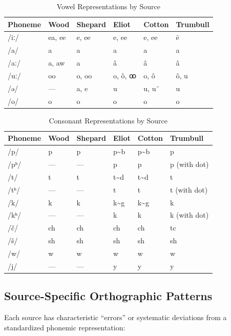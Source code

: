 \begin{table}[htbp]
\centering
\caption{Vowel Representations by Source}
\label{tab:1365-vowels}
\begin{tabular}{llllll}
\hline
Phoneme & Wood & Shepard & Eliot & Cotton & Trumbull \\
\hline
/iː/ & ea, ee & e, ee & e, ee & e, ee & ē \\
/a/ & a & a & a & a & a \\
/aː/ & a, aw & a & â & â & â \\
/uː/ & oo & o, oo & o, ô, ꝏ & o, ô & ô, u \\
/ə/ & --- & a, e & u & u, u˘ & u \\
/o/ & o & o & o & o & o \\
\hline
\end{tabular}
\end{table}

\begin{table}[htbp]
\centering
\caption{Consonant Representations by Source}
\label{tab:1365-consonants}
\begin{tabular}{llllll}
\hline
Phoneme & Wood & Shepard & Eliot & Cotton & Trumbull \\
\hline
/p/ & p & p & p\textasciitilde b & p\textasciitilde b & p \\
/pʰ/ & --- & --- & p & p & p (with dot) \\
/t/ & t & t & t\textasciitilde d & t\textasciitilde d & t \\
/tʰ/ & --- & --- & t & t & t (with dot) \\
/k/ & k & k & k\textasciitilde g & k\textasciitilde g & k \\
/kʰ/ & --- & --- & k & k & k (with dot) \\
/č/ & ch & ch & ch & ch & tc \\
/š/ & sh & sh & sh & sh & sh \\
/w/ & w & w & w & w & w \\
/j/ & --- & --- & y & y & y \\
\hline
\end{tabular}
\end{table}

\subsection{Source-Specific Orthographic Patterns}

Each source has characteristic ``errors'' or systematic deviations from a
standardized phonemic representation:

